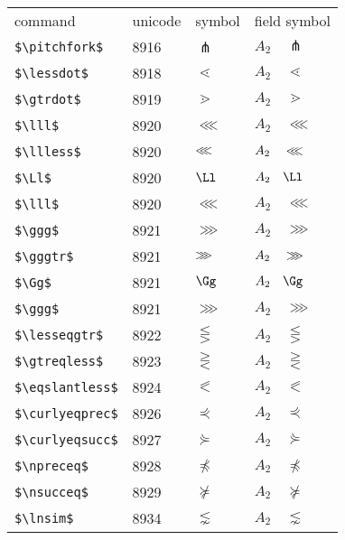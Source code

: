 \documentclass{article}
\begin{document}
\begin{table}
\begin{center}
\begin{tabular}{llll}
 command                      & unicode & symbol                & field symbol\\
 \verb#$\pitchfork$#          & 8916    & $\pitchfork$          & $A_2\quad \pitchfork$\\
 \verb#$\lessdot$#            & 8918    & $\lessdot$            & $A_2\quad \lessdot$\\
 \verb#$\gtrdot$#             & 8919    & $\gtrdot$             & $A_2\quad \gtrdot$\\
 \verb#$\lll$#                & 8920    & $\lll$                & $A_2\quad \lll$\\
 \verb#$\llless$#             & 8920    & $\llless$             & $A_2\quad \llless$\\
 \verb#$\Ll$#                 & 8920    & $\Ll$                 & $A_2\quad \Ll$\\
 \verb#$\lll$#                & 8920    & $\lll$                & $A_2\quad \lll$\\
 \verb#$\ggg$#                & 8921    & $\ggg$                & $A_2\quad \ggg$\\
 \verb#$\gggtr$#              & 8921    & $\gggtr$              & $A_2\quad \gggtr$\\
 \verb#$\Gg$#                 & 8921    & $\Gg$                 & $A_2\quad \Gg$\\
 \verb#$\ggg$#                & 8921    & $\ggg$                & $A_2\quad \ggg$\\
 \verb#$\lesseqgtr$#          & 8922    & $\lesseqgtr$          & $A_2\quad \lesseqgtr$\\
 \verb#$\gtreqless$#          & 8923    & $\gtreqless$          & $A_2\quad \gtreqless$\\
 \verb#$\eqslantless$#        & 8924    & $\eqslantless$        & $A_2\quad \eqslantless$\\
 \verb#$\curlyeqprec$#        & 8926    & $\curlyeqprec$        & $A_2\quad \curlyeqprec$\\
 \verb#$\curlyeqsucc$#        & 8927    & $\curlyeqsucc$        & $A_2\quad \curlyeqsucc$\\
 \verb#$\npreceq$#            & 8928    & $\npreceq$            & $A_2\quad \npreceq$\\
 \verb#$\nsucceq$#            & 8929    & $\nsucceq$            & $A_2\quad \nsucceq$\\
 \verb#$\lnsim$#              & 8934    & $\lnsim$              & $A_2\quad \lnsim$\\

\end{tabular}
\end{center}
\end{table}
\end{document}
